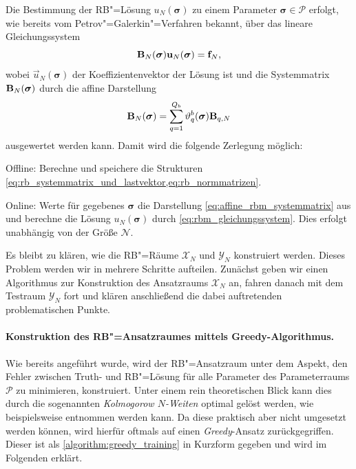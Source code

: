 \documentclass[../main.tex]{subfiles}
\begin{document}
Die Bestimmung der RB"=Lösung $u_{N}(\bm \sigma)$ zu einem Parameter $\bm \sigma \in \mathcal P$ erfolgt, wie bereits vom Petrov"=Galerkin"=Verfahren bekannt, über das lineare Gleichungssystem
\begin{equation}
\label{eq:rbm_gleichungssystem}
    \mathbf{B}_{N}(\bm \sigma) \mathbf{u}_{N}(\bm \sigma) = \mathbf{f}_{N},
\end{equation}
wobei $\vec{u}_{N}(\bm \sigma)$ der Koeffizientenvektor der Lösung ist und die Systemmatrix $\mathbf{B}_{N}(\bm \sigma)$ durch die affine Darstellung
\begin{equation}
\label{eq:affine_rbm_systemmatrix}
    \mathbf{B}_{N}(\bm \sigma) = \sum_{q = 1}^{Q_b} \vartheta_{q}^{b}(\bm \sigma) \mathbf{B}_{q, N}
\end{equation}
ausgewertet werden kann.
Damit wird die folgende Zerlegung möglich:
\begin{onoffdescription}
    \item[Offline:]
    Berechne und speichere die Strukturen \cref{eq:rb_systemmatrix_und_lastvektor,eq:rb_normmatrizen}.

    \item[Online:]
    Werte für gegebenes $\bm \sigma$ die Darstellung \cref{eq:affine_rbm_systemmatrix} aus und berechne die Lösung $u_{N}(\bm \sigma)$ durch \cref{eq:rbm_gleichungssystem}.
    Dies erfolgt unabhängig von der Größe $\mathcal N$.
\end{onoffdescription}

Es bleibt zu klären, wie die RB"=Räume $\mathcal X_{N}$ und $\mathcal Y_{N}$ konstruiert werden.
Dieses Problem werden wir in mehrere Schritte aufteilen.
Zunächst geben wir einen Algorithmus zur Konstruktion des Ansatzraums $\mathcal X_{N}$ an, fahren danach mit dem Testraum $\mathcal Y_{N}$ fort und klären anschließend die dabei auftretenden problematischen Punkte.

\paragraph{Konstruktion des RB"=Ansatzraumes mittels Greedy-Algorithmus.} %
\label{par:konstruktion_des_reduzierte_basis_ansatzraumes_mittels_greedy_algorithmus}

Wie bereits angeführt wurde, wird der RB"=Ansatzraum unter dem Aspekt, den Fehler zwischen Truth- und RB"=Lösung für alle Parameter des Parameterraums $\mathcal P$ zu minimieren, konstruiert.
Unter einem rein theoretischen Blick kann dies durch die sogenannten \emph{Kolmogorow $N$-Weiten} optimal gelöst werden, wie beispielsweise \cite[Section 3.4]{Patera:2007un} entnommen werden kann.
Da diese praktisch aber nicht umgesetzt werden können, wird hierfür oftmals auf einen \emph{Greedy}-Ansatz zurückgegriffen.
Dieser ist als \cref{algorithm:greedy_training} in Kurzform gegeben und wird im Folgenden erklärt.
\end{document}

